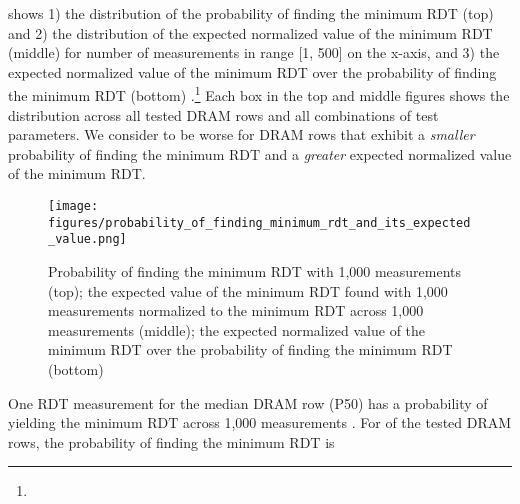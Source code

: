  shows 1) the
distribution of the probability of finding the minimum RDT  (top) and 2) the distribution of the expected normalized value of the
minimum RDT  (middle) for number of measurements
 in  range [1, 500] on the x-axis, and 3) the expected
normalized value of the minimum RDT over the probability of finding the minimum
RDT (bottom)  .\footnote{} Each box in the top and middle figures shows the
distribution across all tested DRAM rows and all combinations of test
parameters. We consider \phenomenon{} to be worse for DRAM rows that exhibit a
\emph{smaller} probability of finding the minimum RDT and a \emph{greater}
expected normalized value of the minimum RDT.   

\begin{figure}[!ht]
    \centering
    \texttt{[image: figures/probability\_of\_finding\_minimum\_rdt\_and\_its\_expected\_value.png]}
    \caption{Probability of finding the minimum RDT with  1,000
    measurements (top); the expected value of the minimum RDT found with
     1,000 measurements normalized to the minimum RDT across 1,000
    measurements (middle); the expected normalized value of the minimum RDT over
    the probability of finding the minimum RDT (bottom)}
    \label{fig:rdt_ratio_all}
\end{figure}


One RDT measurement for the median DRAM row (P50) has a 
probability of yielding the minimum RDT across 1,000 measurements
. For  of the
tested DRAM rows, the probability of finding the minimum RDT  is

